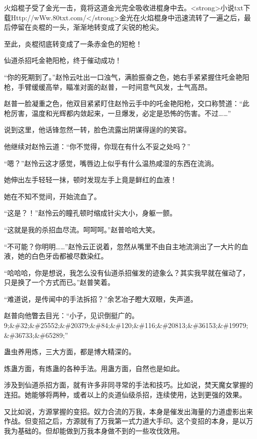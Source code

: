
\begin{this_body}

火焰棍子受了金光一击，竟将这道金光完全吸收进棍身中去。<strong>小说txt下载Http://wWw.80txt.com/</strong>金光在火焰棍身中迅速流转了一遍之后，最后停留在炎棍的一头，渐渐地转变成了尖锐的枪尖。

至此，炎棍彻底转变成了一条赤金色的短枪！

仙道杀招吒金艳阳枪，终于催动成功！

“你的死期到了。”赵怜云吐出一口浊气，满脸振奋之色，她右手紧紧握住吒金艳阳枪，手臂缓缓高举，瞄准对面的赵普，一时间意气风发，士气高昂。

赵普一脸凝重之色，他双目紧紧盯住赵怜云手中的吒金艳阳枪，交口称赞道：“此枪厉害，温度和光辉都内敛起来，一旦爆发，必定是恐怖的伤害。不过……”

说到这里，他话锋忽然一转，脸色流露出阴谋得逞的的笑容。

他继续对赵怜云道：“你不觉得，你现在有什么不妥之处吗？”

“嗯？”赵怜云这才感觉，嘴唇边上似乎有什么温热咸湿的东西在流淌。

她伸出左手轻轻一抹，顿时发现左手上竟是鲜红的血液！

她在不知不觉间，开始流血了。

“这是？！”赵怜云的瞳孔顿时缩成针尖大小，身躯一颤。

“这就是我的杀招血尽流。呵呵呵。”赵普哈哈大笑。

“不可能？你明明……”赵怜云正说着，忽然从嘴里不由自主地流淌出了一大片的血液，她的白色牙齿都被尽数染红。

“哈哈哈，你是想说，我怎么没有仙道杀招催发的迹象么？其实我早就在催动了，只是换了一个方式而已。”赵普笑着。

“难道说，是传闻中的手法拆招？”余艺冶子瞪大双眼，失声道。

赵普向他瞥去目光：“小子，见识倒挺广的。9;\&\#32;\&\#25552;\&\#20379;\&\#84;\&\#120;\&\#116;\&\#20813;\&\#36153;\&\#19979;\&\#36733;\&\#65289;”

蛊虫养用炼，三大方面，都是博大精深的。

炼蛊方面，有炼蛊的各种手法。用蛊方面，自然也是如此。

涉及到仙道杀招方面，就有许多非同寻常的手法和技巧。比如说，焚天魔女掌握的连招。她能够将两种，或者以上的炎道仙级杀招，连续使用，达到更强的效果。

又比如说，方源掌握的变招。奴力合流的万我，本身是催发出海量的力道虚影出来作战。但变招之后，方源就有了万我第一式力道大手印。这个变招的本身，是以万我为基础的。但却能做到万我本身做不到的一些攻伐效用。


\end{this_body}
